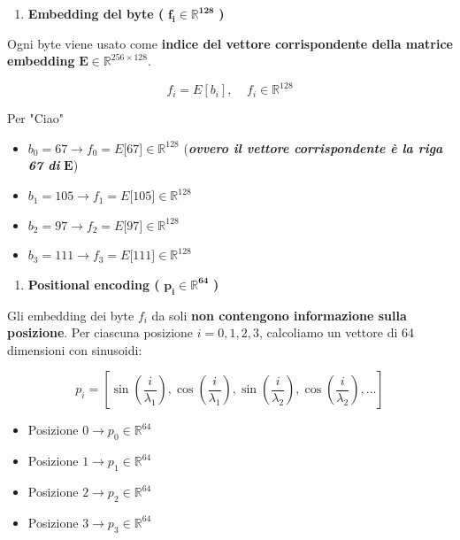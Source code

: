 \documentclass[
  11pt,
]{article}
\begin{document}
\begin{enumerate}
\def\labelenumi{\arabic{enumi}.}
\setcounter{enumi}{1}
\item
  \textbf{Embedding del byte (}
  \(\mathbf{f}_{\mathbf{i}}\mathbf{\in}\mathbb{R}^{\mathbf{128}}\)
  \textbf{)}
\end{enumerate}

Ogni byte viene usato come \textbf{indice del vettore corrispondente
della matrice embedding} \(\mathbf{E} \in \mathbb{R}^{256 \times 128}\).

\[f_{i} = E\left\lbrack b_{i} \right\rbrack,\ \ \ \ \ f_{i} \in \mathbb{R}^{128}\]

Per "Ciao"

\begin{itemize}
\item
  \(b_{0} = 67 \rightarrow f_{0} = E\lbrack 67\rbrack \in \mathbb{R}^{128}\)
  (\emph{\textbf{ovvero il vettore corrispondente è la riga 67 di}}
  \(\mathbf{E}\))
\item
  \(b_{1} = 105 \rightarrow f_{1} = E\lbrack 105\rbrack \in \mathbb{R}^{128}\)
\item
  \(b_{2} = 97 \rightarrow f_{2} = E\lbrack 97\rbrack \in \mathbb{R}^{128}\)
\item
  \(b_{3} = 111 \rightarrow f_{3} = E\lbrack 111\rbrack \in \mathbb{R}^{128}\)
\end{itemize}

\begin{enumerate}
\def\labelenumi{\arabic{enumi}.}
\setcounter{enumi}{2}
\item
  \textbf{Positional encoding (}
  \(\mathbf{p}_{\mathbf{i}}\mathbf{\in}\mathbb{R}^{\mathbf{64}}\)
  \textbf{)}
\end{enumerate}

Gli embedding dei byte \(f_{i}\) da soli \textbf{non
contengono informazione sulla posizione}. Per ciascuna posizione
\(i = 0,1,2,3\), calcoliamo un vettore di 64 dimensioni con sinusoidi:

\[p_{i} = \left\lbrack \sin\left( \frac{i}{\lambda_{1}} \right),\cos\left( \frac{i}{\lambda_{1}} \right),\sin\left( \frac{i}{\lambda_{2}} \right),\cos\left( \frac{i}{\lambda_{2}} \right),\ldots \right\rbrack\]

\begin{itemize}
\item
  Posizione \(0 \rightarrow p_{0} \in \mathbb{R}^{64}\)
\item
  Posizione \(1 \rightarrow p_{1} \in \mathbb{R}^{64}\)
\item
  Posizione \(2 \rightarrow p_{2} \in \mathbb{R}^{64}\)
\item
  Posizione \(3 \rightarrow p_{3} \in \mathbb{R}^{64}\)
\end{itemize}
\end{document}
